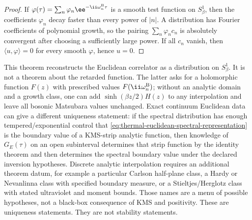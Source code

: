 \begin{proof}
If \(\varphi(\tau)=\sum_n\varphi_n\ee^{-\ii\omega_n^{\rm B}\tau}\) is a
smooth test function on \(S^1_\beta\), then the coefficients
\(\varphi_n\) decay faster than every power of \(|n|\).  A distribution has
Fourier coefficients of polynomial growth, so the pairing
\(\sum_n\varphi_n c_n\) is absolutely convergent after choosing a sufficiently
large power.  If all \(c_n\) vanish, then \(\langle u,\varphi\rangle=0\) for
every smooth \(\varphi\), hence \(u=0\).
\end{proof}

This theorem reconstructs the Euclidean correlator as a distribution on
\(S^1_\beta\).  It is not a theorem about the retarded function.  The latter
asks for a holomorphic function \(F(z)\) with prescribed values
\(F(\ii\omega_n^{\rm B})\); without an analytic domain and a growth class,
one can add \(\sinh(\beta z/2)H(z)\) to any interpolation and leave all
bosonic Matsubara values unchanged.  Exact continuum Euclidean data can give
a different uniqueness statement: if the spectral distribution has enough
tempered/exponential control that
\eqref{eq:thermal-euclidean-spectral-representation} is the boundary value
of a KMS-strip analytic function, then knowledge of \(G_E(\tau)\) on an open
subinterval determines that strip function by the identity theorem and then
determines the spectral boundary value under the declared inversion
hypotheses.  Discrete analytic interpolation requires an additional theorem
datum, for example a particular Carlson half-plane class, a Hardy or
Nevanlinna class with specified boundary measure, or a Stieltjes/Herglotz
class with stated ultraviolet and moment bounds.  Those names are a menu of
possible hypotheses, not a black-box consequence of KMS and positivity.
These are uniqueness statements.  They are not stability statements.

